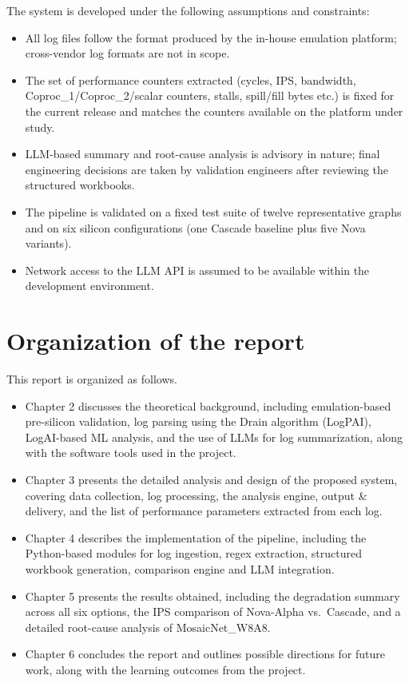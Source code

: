 The system is developed under the following assumptions and constraints:
\begin{itemize}
\item All log files follow the format produced by the in-house emulation platform; cross-vendor log formats are not in scope.
\item The set of performance counters extracted (cycles, IPS, bandwidth, Coproc\_1/Coproc\_2/scalar counters, stalls, spill/fill bytes etc.) is fixed for the current release and matches the counters available on the platform under study.
\item LLM-based summary and root-cause analysis is advisory in nature; final engineering decisions are taken by validation engineers after reviewing the structured workbooks.
\item The pipeline is validated on a fixed test suite of twelve representative graphs and on six silicon configurations (one Cascade baseline plus five Nova variants).
\item Network access to the LLM API is assumed to be available within the development environment.
\end{itemize}

\section[Organization of the report]{\textbf{Organization of the report}}

This report is organized as follows.
\begin{itemize}
\item Chapter 2 discusses the theoretical background, including emulation-based pre-silicon validation, log parsing using the Drain algorithm (LogPAI), LogAI-based ML analysis, and the use of LLMs for log summarization, along with the software tools used in the project.
\item Chapter 3 presents the detailed analysis and design of the proposed system, covering data collection, log processing, the analysis engine, output \& delivery, and the list of performance parameters extracted from each log.
\item Chapter 4 describes the implementation of the pipeline, including the Python-based modules for log ingestion, regex extraction, structured workbook generation, comparison engine and LLM integration.
\item Chapter 5 presents the results obtained, including the degradation summary across all six options, the IPS comparison of Nova-Alpha vs.\ Cascade, and a detailed root-cause analysis of MosaicNet\_W8A8.
\item Chapter 6 concludes the report and outlines possible directions for future work, along with the learning outcomes from the project.
\end{itemize}
